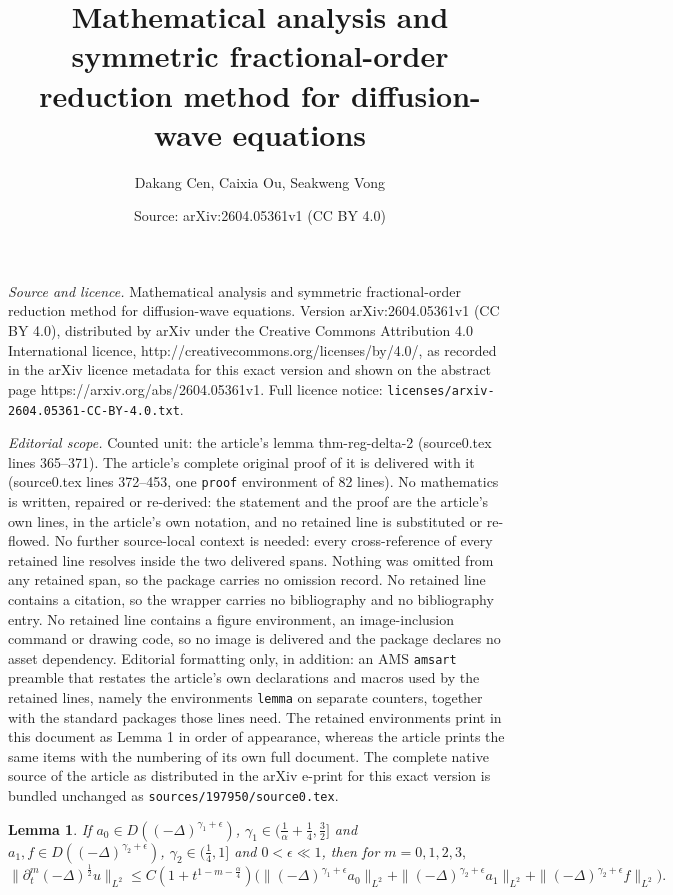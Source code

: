\documentclass[10pt,a4paper]{amsart}
\title{Mathematical analysis and symmetric fractional-order reduction method for diffusion-wave equations}
\author{Dakang Cen, Caixia Ou, Seakweng Vong}
\date{Source: arXiv:2604.05361v1 (CC BY 4.0)}
\newtheorem{lemma}{Lemma}
\begin{document}
\maketitle

\noindent\emph{Source and licence.} Mathematical analysis and symmetric fractional-order reduction method for diffusion-wave equations. Version arXiv:2604.05361v1 (CC BY 4.0), distributed by arXiv under the Creative Commons Attribution 4.0 International licence, http://creativecommons.org/licenses/by/4.0/, as recorded in the arXiv licence metadata for this exact version and shown on the abstract page https://arxiv.org/abs/2604.05361v1. Full licence notice: \texttt{licenses/arxiv-2604.05361-CC-BY-4.0.txt}.\par\smallskip

\noindent\textit{Editorial scope.} Counted unit: the article's lemma thm-reg-delta-2 (source0.tex lines 365--371). The article's complete original proof of it is delivered with it (source0.tex lines 372--453, one \texttt{proof} environment of 82 lines). No mathematics is written, repaired or re-derived: the statement and the proof are the article's own lines, in the article's own notation, and no retained line is substituted or re-flowed.  No further source-local context is needed: every cross-reference of every retained line resolves inside the two delivered spans.  Nothing was omitted from any retained span, so the package carries no omission record.  No retained line contains a citation, so the wrapper carries no bibliography and no bibliography entry.  No retained line contains a figure environment, an image-inclusion command or drawing code, so no image is delivered and the package declares no asset dependency.  Editorial formatting only, in addition: an AMS \texttt{amsart} preamble that restates the article's own declarations and macros used by the retained lines, namely the environments \texttt{lemma} on separate counters, together with the standard packages those lines need.  The retained environments print in this document as Lemma 1 in order of appearance, whereas the article prints the same items with the numbering of its own full document.  The complete native source of the article as distributed in the arXiv e-print for this exact version is bundled unchanged as \texttt{sources/197950/source0.tex}.
\begin{lemma}\label{thm-reg-delta-2}
If $a_0\in D((-\Delta)^{\gamma_1+\epsilon})$, $\gamma_1\in(\frac{1}{\alpha}+\frac14,\frac32]$ and $a_1,f\in D((-\Delta)^{\gamma_2+\epsilon})$, $\gamma_2\in(\frac{1}{4},1]$ and $0<\epsilon \ll 1$, then for $m=0,1,2,3,$
\[
\|\partial_t^m(-\Delta)^{\frac12}u\|_{L^2}\le C(1+t^{1-m-\frac{\alpha}{4}})\Big(\|(-\Delta)^{\gamma_1+\epsilon}a_0\|_{L^2}
+\|(-\Delta)^{\gamma_2+\epsilon}a_1\|_{L^2}+\|(-\Delta)^{\gamma_2+\epsilon}f\|_{L^2}\Big).
\]
\end{lemma}
\end{document}
